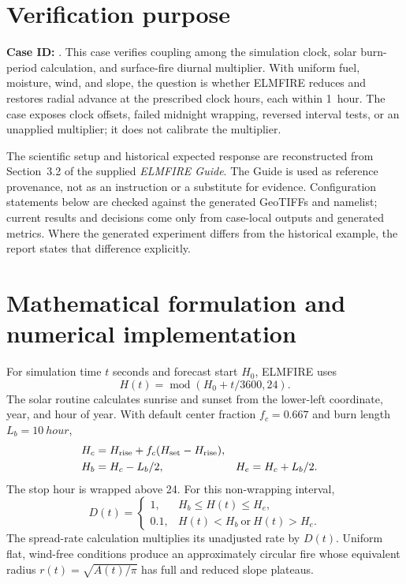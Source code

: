 \section{Verification purpose}

\textbf{Case ID:} \texttt{\CaseID}. This case verifies coupling among the simulation clock, solar burn-period calculation, and surface-fire diurnal multiplier. With uniform fuel, moisture, wind, and slope, the question is whether ELMFIRE reduces and restores radial advance at the prescribed clock hours, each within \SI{1}{hour}. The case exposes clock offsets, failed midnight wrapping, reversed interval tests, or an unapplied multiplier; it does not calibrate the multiplier.

The scientific setup and historical expected response are reconstructed from Section~3.2 of the supplied \emph{ELMFIRE Guide}. The Guide is used as reference provenance, not as an instruction or a substitute for evidence. Configuration statements below are checked against the generated GeoTIFFs and namelist; current results and decisions come only from case-local outputs and generated metrics. Where the generated experiment differs from the historical example, the report states that difference explicitly.

\section{Mathematical formulation and numerical implementation}

For simulation time $t$ seconds and forecast start $H_0$, ELMFIRE uses
\begin{equation}H(t)=\operatorname{mod}\!\left(H_0+t/3600,24\right).\end{equation}
The solar routine calculates sunrise and sunset from the lower-left coordinate, year, and hour of year. With default center fraction $f_c=0.667$ and burn length $L_b=\SI{10}{hour}$,
\begin{align}H_c&=H_{\rm rise}+f_c(H_{\rm set}-H_{\rm rise}),\\H_b&=H_c-L_b/2,&H_e&=H_c+L_b/2.\end{align}
The stop hour is wrapped above 24. For this non-wrapping interval,
\begin{equation}D(t)=\begin{cases}1,&H_b\le H(t)\le H_e,\\0.1,&H(t)<H_b\ \text{or}\ H(t)>H_e.\end{cases}\end{equation}
The spread-rate calculation multiplies its unadjusted rate by $D(t)$. Uniform flat, wind-free conditions produce an approximately circular fire whose equivalent radius $r(t)=\sqrt{A(t)/\pi}$ has full and reduced slope plateaus.

